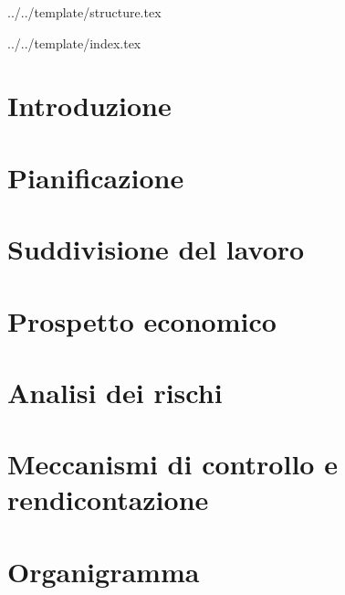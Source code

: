 

\def\DOCUMENTO{Piano di Progetto}
\def\VERSIONE{1.0.0}

\def\DESCRIZIONE{Documento che definisce la pianificazione delle attività del gruppo \GRUPPO{} nello svolgimento del progetto \PROGETTO.}

\def\REDATTORE {Agostinetto Matteo \\ & Burlin Valerio}
\def\VERIFICATORE {Ros Fabio}
\def\RESPONSABILE {Suierica Bogdan}

\def\USO {Esterno}

\def\DISTRIBUZIONE {\GRUPPO{}\\ & \COMMITTENTE{}\\}

\def\DESCRIZIONE {Documento che definisce la pianificazione delle attività del gruppo \GRUPPO{} nello svolgimento del progetto \PROGETTO.}


\def\INDICE	{true}
\def\TABELLE {true}
\def\FIGURE {true}


 {../../template/structure.tex}


 {../../template/index.tex}



%

\section{Introduzione}

\newpage
\section{Pianificazione}

\newpage
\section{Suddivisione del lavoro}

\newpage
\section{Prospetto economico}

\newpage
\section{Analisi dei rischi}

\newpage
\section{Meccanismi di controllo e rendicontazione}

\newpage
\appendix 
\section{Organigramma}

\newpage


